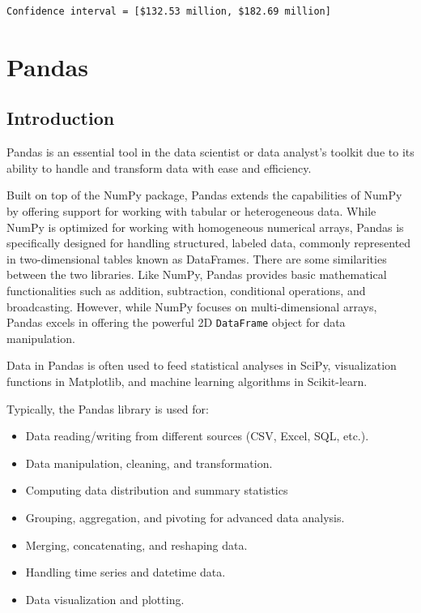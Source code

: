 \documentclass[
  letterpaper,
  DIV=11,
  numbers=noendperiod]{scrreprt}
\providecommand{\tightlist}{%
  \setlength{\itemsep}{0pt}\setlength{\parskip}{0pt}}\usepackage{longtable,booktabs,array}
\begin{document}
\begin{verbatim}
Confidence interval = [$132.53 million, $182.69 million]
\end{verbatim}

\hypertarget{pandas}{%
\chapter{Pandas}\label{pandas}}

\hypertarget{introduction}{%
\section{Introduction}\label{introduction}}

Pandas is an essential tool in the data scientist or data analyst's
toolkit due to its ability to handle and transform data with ease and
efficiency.

Built on top of the NumPy package, Pandas extends the capabilities of
NumPy by offering support for working with tabular or heterogeneous
data. While NumPy is optimized for working with homogeneous numerical
arrays, Pandas is specifically designed for handling structured, labeled
data, commonly represented in two-dimensional tables known as
DataFrames. There are some similarities between the two libraries. Like
NumPy, Pandas provides basic mathematical functionalities such as
addition, subtraction, conditional operations, and broadcasting.
However, while NumPy focuses on multi-dimensional arrays, Pandas excels
in offering the powerful 2D \texttt{DataFrame} object for data
manipulation.

Data in Pandas is often used to feed statistical analyses in SciPy,
visualization functions in Matplotlib, and machine learning algorithms
in Scikit-learn.

Typically, the Pandas library is used for:

\begin{itemize}
\tightlist
\item
  Data reading/writing from different sources (CSV, Excel, SQL, etc.).
\item
  Data manipulation, cleaning, and transformation.
\item
  Computing data distribution and summary statistics
\item
  Grouping, aggregation, and pivoting for advanced data analysis.
\item
  Merging, concatenating, and reshaping data.
\item
  Handling time series and datetime data.
\item
  Data visualization and plotting.
\end{itemize}
\end{document}
